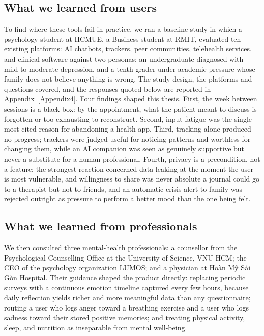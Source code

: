 \subsection*{What we learned from users}

To find where these tools fail in practice, we ran a baseline study in which a
psychology student at HCMUE, a Business student at
RMIT, evaluated ten existing platforms: AI chatbots,
trackers, peer communities, telehealth services, and clinical software
against two personas: an undergraduate diagnosed with mild-to-moderate
depression, and a tenth-grader under academic pressure whose family does not
believe anything is wrong. The study design, the platforms and questions
covered, and the responses quoted below are reported in
Appendix~\ref{Appendix4}. Four findings shaped this thesis. First, the week
between sessions is a black box: by the appointment, what the patient
meant to discuss is forgotten or too exhausting to reconstruct. Second,
input fatigue was the single most cited reason for abandoning a health
app. Third, tracking alone produced no progress;
trackers were judged useful for noticing patterns and worthless for changing
them, while an AI companion was seen as genuinely supportive but never a
substitute for a human professional. Fourth, privacy is a precondition,
not a feature: the strongest reaction concerned data leaking at the moment the
user is most vulnerable, and willingness to share was never absolute a
journal could go to a therapist but not to friends, and an automatic crisis
alert to family was rejected outright as pressure to perform a better mood than
the one being felt.

\subsection*{What we learned from professionals}

We then consulted three mental-health professionals: a counsellor from the
Psychological Counselling Office at the University of Science, VNU-HCM; the CEO
of the psychology organization LUMOS; and a physician at Hoàn Mỹ Sài Gòn
Hospital. Their guidance shaped the product directly: replacing periodic
surveys with a continuous emotion timeline captured every few hours, because
daily reflection yields richer and more meaningful data than any questionnaire;
routing a user who logs anger toward a breathing exercise and a user who logs
sadness toward their stored positive memories; and treating physical activity,
sleep, and nutrition as inseparable from mental well-being.

